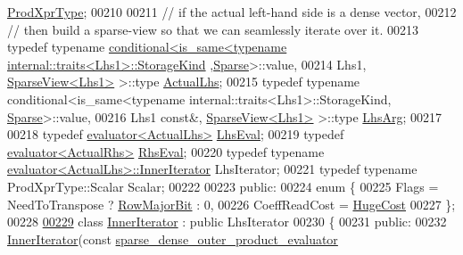 \begin{DoxyCode}
      \hyperlink{group___core___module_class_eigen_1_1_product}{ProdXprType};
00210   
00211   \textcolor{comment}{// if the actual left-hand side is a dense vector,}
00212   \textcolor{comment}{// then build a sparse-view so that we can seamlessly iterate over it.}
00213   \textcolor{keyword}{typedef} \textcolor{keyword}{typename} 
      \hyperlink{struct_eigen_1_1internal_1_1conditional}{conditional<is\_same<typename internal::traits<Lhs1>::StorageKind}
      ,\hyperlink{struct_eigen_1_1_sparse}{Sparse}>::value,
00214             Lhs1, \hyperlink{group___sparse_core___module_class_eigen_1_1_sparse_view}{SparseView<Lhs1>} >::type \hyperlink{class_eigen_1_1internal_1_1_tensor_lazy_evaluator_writable}{ActualLhs};
00215   \textcolor{keyword}{typedef} \textcolor{keyword}{typename} conditional<is\_same<typename internal::traits<Lhs1>::StorageKind,
      \hyperlink{struct_eigen_1_1_sparse}{Sparse}>::value,
00216             Lhs1 \textcolor{keyword}{const}&, \hyperlink{group___sparse_core___module_class_eigen_1_1_sparse_view}{SparseView<Lhs1>} >::type \hyperlink{class_eigen_1_1internal_1_1_tensor_lazy_evaluator_writable}{LhsArg};
00217             
00218   \textcolor{keyword}{typedef} \hyperlink{struct_eigen_1_1internal_1_1evaluator}{evaluator<ActualLhs>} \hyperlink{struct_eigen_1_1internal_1_1evaluator}{LhsEval};
00219   \textcolor{keyword}{typedef} \hyperlink{struct_eigen_1_1internal_1_1evaluator}{evaluator<ActualRhs>} \hyperlink{struct_eigen_1_1internal_1_1evaluator}{RhsEval};
00220   \textcolor{keyword}{typedef} \textcolor{keyword}{typename} \hyperlink{struct_eigen_1_1internal_1_1evaluator}{evaluator<ActualLhs>::InnerIterator} LhsIterator;
00221   \textcolor{keyword}{typedef} \textcolor{keyword}{typename} ProdXprType::Scalar Scalar;
00222   
00223 \textcolor{keyword}{public}:
00224   \textcolor{keyword}{enum} \{
00225     Flags = NeedToTranspose ? \hyperlink{group__flags_gae4f56c2a60bbe4bd2e44c5b19cbe8762}{RowMajorBit} : 0,
00226     CoeffReadCost = \hyperlink{namespace_eigen_a3163430a1c13173faffde69016b48aaf}{HugeCost}
00227   \};
00228   
\hyperlink{class_eigen_1_1internal_1_1sparse__dense__outer__product__evaluator_1_1_inner_iterator}{00229}   \textcolor{keyword}{class }\hyperlink{class_eigen_1_1internal_1_1sparse__dense__outer__product__evaluator_1_1_inner_iterator}{InnerIterator} : \textcolor{keyword}{public} LhsIterator
00230   \{
00231   \textcolor{keyword}{public}:
00232     \hyperlink{class_eigen_1_1internal_1_1sparse__dense__outer__product__evaluator_1_1_inner_iterator}{InnerIterator}(\textcolor{keyword}{const} \hyperlink{struct_eigen_1_1internal_1_1sparse__dense__outer__product__evaluator}{sparse\_dense\_outer\_product\_evaluator}

\end{DoxyCode}

